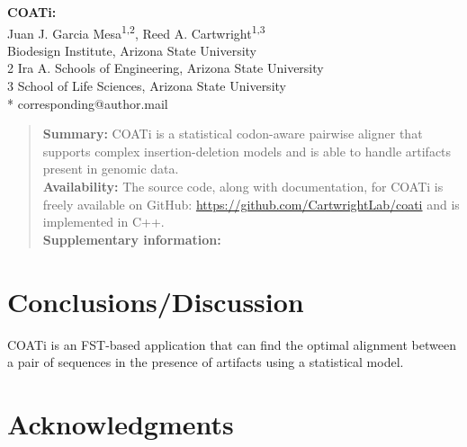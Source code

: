 



\begin{flushleft}
{\Large\textbf{COATi: }}
\newline
\\
Juan J. Garcia Mesa\textsuperscript{1,2},
Reed A. Cartwright\textsuperscript{1,3}
\\
 Biodesign Institute, Arizona State University
\\
2 Ira A. Schools of Engineering, Arizona State University
\\
3 School of Life Sciences, Arizona State University
\\
\bigskip
* corresponding@author.mail

\end{flushleft}

\begin{abstract}
\noindent \textbf{Summary:} COATi is a statistical codon-aware pairwise aligner
that supports complex insertion-deletion models and is able to handle artifacts
present in genomic data.\\  %
\textbf{Availability:} The source code, along with documentation, for COATi is
freely available on GitHub: \url{https://github.com/CartwrightLab/coati} and is
implemented in C++.\\
\textbf{Supplementary information:} %
\end{abstract}


\linenumbers







\section{Conclusions/Discussion}

COATi is an FST-based application that can find the optimal alignment between a
pair of sequences in the presence of artifacts using a statistical model.

\section*{Acknowledgments}

